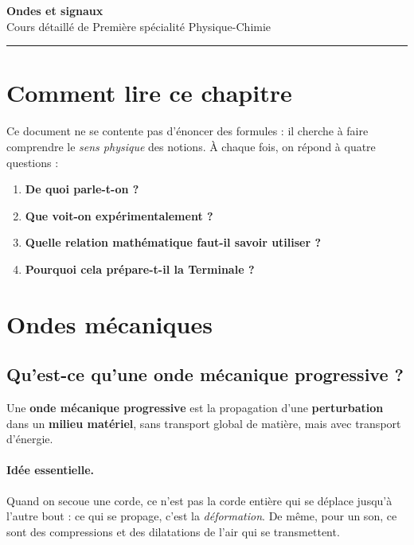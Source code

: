 \documentclass[11pt,a4paper]{article}
\begin{document}
\begin{center}
    {\LARGE\bfseries Ondes et signaux}\\[0.3em]
    {\large Cours détaillé de Première spécialité Physique-Chimie}\\[0.4em]
    \rule{0.9\linewidth}{0.6pt}
\end{center}

\tableofcontents
\bigskip

\section*{Comment lire ce chapitre}
Ce document ne se contente pas d'énoncer des formules : il cherche à faire comprendre le \emph{sens physique} des notions. À chaque fois, on répond à quatre questions :
\begin{enumerate}[label=\arabic*.]
    \item \textbf{De quoi parle-t-on ?}
    \item \textbf{Que voit-on expérimentalement ?}
    \item \textbf{Quelle relation mathématique faut-il savoir utiliser ?}
    \item \textbf{Pourquoi cela prépare-t-il la Terminale ?}
\end{enumerate}

\section{Ondes mécaniques}

\subsection{Qu'est-ce qu'une onde mécanique progressive ?}

\begin{definitionbox}
Une \textbf{onde mécanique progressive} est la propagation d'une \textbf{perturbation} dans un \textbf{milieu matériel}, sans transport global de matière, mais avec transport d'énergie.
\end{definitionbox}

\paragraph{Idée essentielle.}
Quand on secoue une corde, ce n'est pas la corde entière qui se déplace jusqu'à l'autre bout : ce qui se propage, c'est la \emph{déformation}. De même, pour un son, ce sont des compressions et des dilatations de l'air qui se transmettent.
\end{document}
